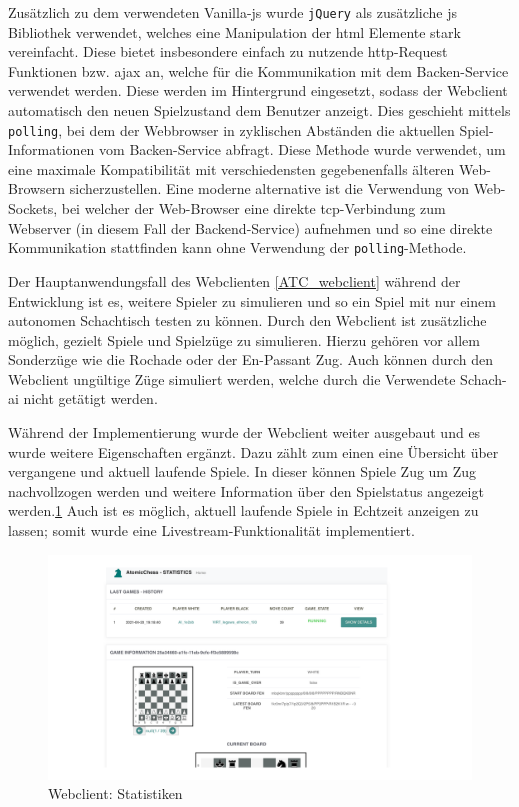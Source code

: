 Zusätzlich zu dem verwendeten Vanilla-\gls{js} wurde
\passthrough{\lstinline!jQuery!}\cite{jquery} als zusätzliche
\gls{js} Bibliothek verwendet, welches eine Manipulation der \gls{html}
Elemente stark vereinfacht. Diese bietet insbesondere einfach zu
nutzende \gls{http}-Request Funktionen bzw. \gls{ajax} an, welche für
die Kommunikation mit dem Backen-Service verwendet werden. Diese werden
im Hintergrund eingesetzt, sodass der Webclient automatisch den neuen
Spielzustand dem Benutzer anzeigt. Dies geschieht mittels
\passthrough{\lstinline!polling!}, bei dem der Webbrowser in zyklischen
Abständen die aktuellen Spiel-Informationen vom Backen-Service abfragt.
Diese Methode wurde verwendet, um eine maximale Kompatibilität mit
verschiedensten gegebenenfalls älteren Web-Browsern sicherzustellen.
Eine moderne alternative ist die Verwendung von Web-Sockets, bei welcher
der Web-Browser eine direkte \gls{tcp}-Verbindung zum Webserver (in
diesem Fall der Backend-Service) aufnehmen und so eine direkte
Kommunikation stattfinden kann ohne Verwendung der
\passthrough{\lstinline!polling!}-Methode.

Der Hauptanwendungsfall des Webclienten \ref{ATC_webclient} während der
Entwicklung ist es, weitere Spieler zu simulieren und so ein Spiel mit
nur einem autonomen Schachtisch testen zu können. Durch den Webclient
ist zusätzliche möglich, gezielt Spiele und Spielzüge zu simulieren.
Hierzu gehören vor allem Sonderzüge wie die Rochade oder der En-Passant
Zug. Auch können durch den Webclient ungültige Züge simuliert werden,
welche durch die Verwendete Schach-\gls{ai} nicht getätigt werden.

Während der Implementierung wurde der Webclient weiter ausgebaut und es
wurde weitere Eigenschaften ergänzt. Dazu zählt zum einen eine Übersicht
über vergangene und aktuell laufende Spiele. In dieser können Spiele Zug
um Zug nachvollzogen werden und weitere Information über den Spielstatus
angezeigt werden.\ref{ATC_statistics} Auch ist es möglich, aktuell
laufende Spiele in Echtzeit anzeigen zu lassen; somit wurde eine
Livestream-Funktionalität implementiert.

\begin{figure}
\centering
\includegraphics{images/ATC_statistics.png}
\caption{Webclient: Statistiken \label{ATC_statistics}}
\end{figure}

